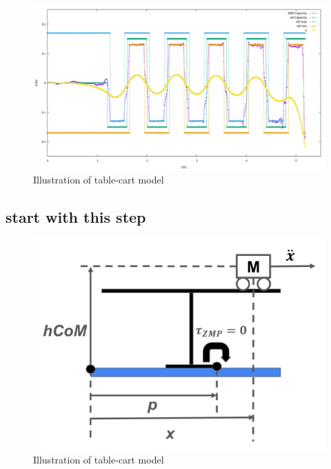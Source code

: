 \begin{figure}[H]
  \centering
 \includegraphics[keepaspectratio, scale=0.25]
      {images/mpc_qr/mpc_qr_10_9_error.png}
 \caption{Illustration of table-cart model}
 \label{Fig:Illustration of table-cart model}
\end{figure}

\subsection{start with this step}


\begin{figure}[H]
  \centering
 \includegraphics[keepaspectratio, scale=0.5]
      {images/walk/table.png}
 \caption{Illustration of table-cart model}
 \label{Fig:Illustration of table-cart model}
\end{figure}

\newpage
